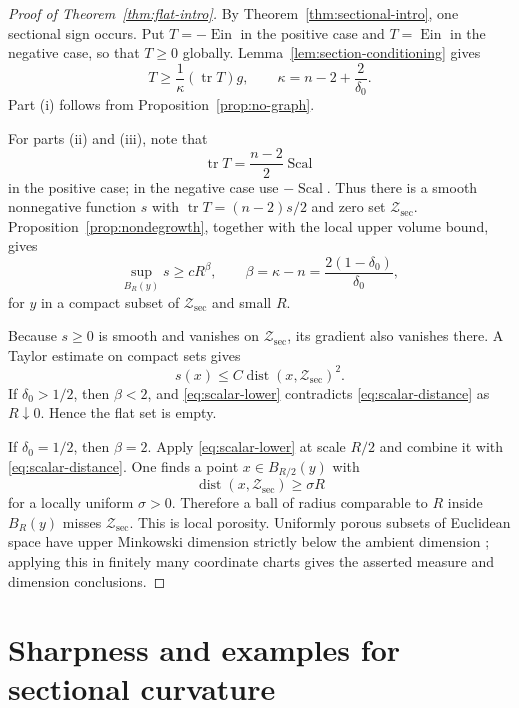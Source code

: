 \documentclass[11pt,reqno]{amsart}
\theoremstyle{definition}
\theoremstyle{remark}
\newcommand{\Scal}{\operatorname{Scal}}
\newcommand{\Ein}{\operatorname{Ein}}
\newcommand{\tr}{\operatorname{tr}}
\newcommand{\dist}{\operatorname{dist}}
\newcommand{\cZ}{\mathcal Z}
\begin{document}
\begin{proof}[Proof of Theorem~\ref{thm:flat-intro}]
By Theorem~\ref{thm:sectional-intro}, one sectional sign occurs.  Put $T=-\Ein$ in the positive case and $T=\Ein$ in the negative case, so that $T\ge0$ globally.  Lemma~\ref{lem:section-conditioning} gives
\begin{equation}\label{eq:kappa-flat}
T\ge\frac1\kappa(\tr T)g,
\qquad
\kappa=n-2+\frac2{\delta_0}.
\end{equation}
Part (i) follows from Proposition~\ref{prop:no-graph}.

For parts (ii) and (iii), note that
\[
\tr T=\frac{n-2}{2}\Scal
\]
in the positive case; in the negative case use $-\Scal$.  Thus there is a smooth nonnegative function $s$ with $\tr T=(n-2)s/2$ and zero set $\cZ_{\mathrm{sec}}$.  Proposition~\ref{prop:nondegrowth}, together with the local upper volume bound, gives
\begin{equation}\label{eq:scalar-lower}
\sup_{B_R(y)}s\ge cR^\beta,
\qquad
\beta=\kappa-n=\frac{2(1-\delta_0)}{\delta_0},
\end{equation}
for $y$ in a compact subset of $\cZ_{\mathrm{sec}}$ and small $R$.

Because $s\ge0$ is smooth and vanishes on $\cZ_{\mathrm{sec}}$, its gradient also vanishes there.  A Taylor estimate on compact sets gives
\begin{equation}\label{eq:scalar-distance}
s(x)\le C\dist(x,\cZ_{\mathrm{sec}})^2.
\end{equation}
If $\delta_0>1/2$, then $\beta<2$, and \eqref{eq:scalar-lower} contradicts \eqref{eq:scalar-distance} as $R\downarrow0$.  Hence the flat set is empty.

If $\delta_0=1/2$, then $\beta=2$.  Apply \eqref{eq:scalar-lower} at scale $R/2$ and combine it with \eqref{eq:scalar-distance}.  One finds a point $x\in B_{R/2}(y)$ with
\[
\dist(x,\cZ_{\mathrm{sec}})\ge\sigma R
\]
for a locally uniform $\sigma>0$.  Therefore a ball of radius comparable to $R$ inside $B_R(y)$ misses $\cZ_{\mathrm{sec}}$.  This is local porosity.  Uniformly porous subsets of Euclidean space have upper Minkowski dimension strictly below the ambient dimension \cite{Salli}; applying this in finitely many coordinate charts gives the asserted measure and dimension conclusions.
\end{proof}

\section{Sharpness and examples for sectional curvature}\label{sec:sectional-sharpness}
\end{document}
